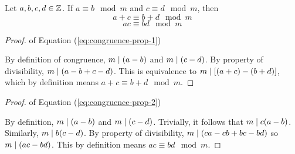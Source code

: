 \begin{proposition}
    Let $a,b,c,d \in \mathbb{Z}$. If $a \equiv b \mod m$ and $c \equiv d \mod m$, then
    \begin{equation} \label{eq:congruence-prop-1}
        a + c \equiv b + d \mod m
    \end{equation}
    \begin{equation} \label{eq:congruence-prop-2}
        ac \equiv bd \mod m
    \end{equation}
\end{proposition}

\begin{proof} of Equation (\ref{eq:congruence-prop-1})

    By definition of congruence, $m \mathrel{\mid} (a-b)$ and $m \mathrel{\mid} (c-d)$. By property of divisibility, $m \mathrel{\mid} (a-b+c-d)$. This is equivalence to $m \mathrel{\mid} [(a+c)-(b+d)]$, which by definition means $a+c \equiv b+d \mod m$.
\end{proof}

\begin{proof}
    of Equation (\ref{eq:congruence-prop-2})

    By definition, $m \mathrel{\mid} (a-b)$ and $m \mathrel{\mid} (c-d)$. Trivially, it follows that $m \mathrel{\mid} c(a-b)$. Similarly, $m \mathrel{\mid} b(c-d)$. By property of divisibility, $m \mathrel{\mid} (ca-cb+bc-bd)$ so $m \mathrel{\mid} (ac-bd)$. This by definition means $ac \equiv bd \mod m$.
\end{proof}

